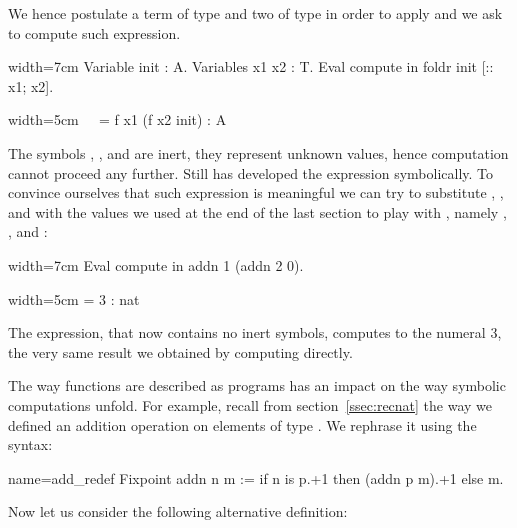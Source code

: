 We hence postulate a term of type  and two of type 
in order to apply  and we ask \Coq{} to compute such
expression.

\begin{coq}{}{width=7cm}
Variable init : A.
Variables x1 x2 : T.
Eval compute in foldr init [:: x1; x2].
\end{coq}
\begin{coqout}{}{width=5cm}
$~$
$~$
= f x1 (f x2 init) : A
\end{coqout}

The symbols , ,  and  are inert,
they represent unknown values, hence computation cannot
proceed any further.  Still
\Coq{} has developed the expression symbolically. 
To convince
ourselves that such expression is meaningful
we can try to substitute , ,  and  with the
values we used at the end of the last section to
play with , namely , ,  and :

\begin{coq}{}{width=7cm}
Eval compute in addn 1 (addn 2 0).
\end{coq}
\begin{coqout}{}{width=5cm}
 = 3 : nat
\end{coqout}

The expression, that now contains no inert symbols, computes to the numeral 3,
the very same result we obtained by computing 
directly.


The way functions are described as programs has an impact on the way
symbolic computations unfold. For example, recall from
section~\ref{ssec:recnat} the way we defined an addition operation on
elements of type . We rephrase it using the  syntax: %

\begin{coq}{name=add_redef}{}
Fixpoint addn n m := if n is p.+1 then (addn p m).+1 else m.
\end{coq}

Now let us consider the following alternative definition:

